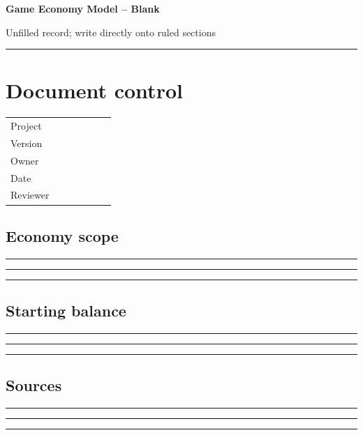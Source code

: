 \documentclass[11pt]{article}
\begin{document}
{\huge\bfseries\color{suiteblue} Game Economy Model -- Blank}\par
\vspace{0.15in}
{\normalsize\color{suitegray} Unfilled record; write directly onto ruled sections}\par
\vspace{0.15in}\hrule\vspace{0.15in}

\section{Document control}
\renewcommand{\arraystretch}{1.8}
\begin{tabularx}{\linewidth}{@{}p{0.30\linewidth}X@{}}\toprule
Project & \hrulefill\\ Version & \hrulefill\\ Owner & \hrulefill\\ Date & \hrulefill\\ Reviewer & \hrulefill\\ \bottomrule\end{tabularx}

\subsection{Economy scope}
\noindent\rule{\linewidth}{0.3pt}\par\vspace{0.18in}
\noindent\rule{\linewidth}{0.3pt}\par\vspace{0.18in}
\noindent\rule{\linewidth}{0.3pt}\par\vspace{0.14in}

\subsection{Starting balance}
\noindent\rule{\linewidth}{0.3pt}\par\vspace{0.18in}
\noindent\rule{\linewidth}{0.3pt}\par\vspace{0.18in}
\noindent\rule{\linewidth}{0.3pt}\par\vspace{0.14in}

\subsection{Sources}
\noindent\rule{\linewidth}{0.3pt}\par\vspace{0.18in}
\noindent\rule{\linewidth}{0.3pt}\par\vspace{0.18in}
\noindent\rule{\linewidth}{0.3pt}\par\vspace{0.14in}
\end{document}
